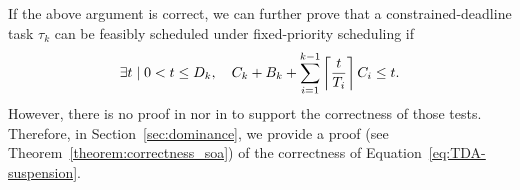 If the above argument is correct, we can further prove that a constrained-deadline task $\tau_k$ can be feasibly scheduled under fixed-priority scheduling if
\begin{equation}
\label{eq:TDA-suspension}
\exists t \mid 0 < t \leq D_k, \quad C_k + B_k + \sum_{i=1}^{k-1}\ceiling{\frac{t}{T_i}} C_i \leq t.
\end{equation}
However, there is no proof in
\cite{Liu:2000:RS:518501} nor in \cite{DBLP:conf/rtss/RajkumarSL88} to support the correctness of those tests. Therefore, in Section~\ref{sec:dominance}, we provide a proof (see Theorem~\ref{theorem:correctness_soa}) of the correctness of Equation~\eqref{eq:TDA-suspension}.

%
